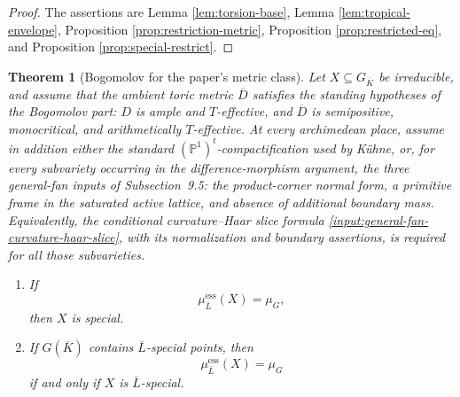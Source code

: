 \documentclass[10pt,a4paper]{amsart}
\theoremstyle{plain}
\newtheorem{theorem}{Theorem}
\theoremstyle{plain}
\numberwithin{equation}{section}
\providecommand{\bD}{\overline{D}}
\providecommand{\bL}{\overline{L}}
\providecommand{\muess}{\mu^{\mathrm{ess}}}
\begin{document}
\begin{proof}
	The assertions are Lemma \ref{lem:torsion-base}, Lemma
	\ref{lem:tropical-envelope}, Proposition \ref{prop:restriction-metric},
	Proposition \ref{prop:restricted-eq}, and Proposition
	\ref{prop:special-restrict}.
\end{proof}

\begin{theorem}[Bogomolov for the paper's metric class]\label{thm:bogomolov}
	Let \(X\subseteq G_{\overline{K}}\) be irreducible, and assume that the ambient
	toric metric \(\bD\) satisfies the standing hypotheses of the Bogomolov part:
	\(D\) is ample and \(T\)-effective, and \(\bD\) is semipositive, monocritical, and
	arithmetically \(T\)-effective.
	At every archimedean place, assume in addition either the standard
	\((\mathbb P^1)^t\)-compactification used by K\"uhne, or, for every subvariety
	occurring in the difference-morphism argument, the three general-fan inputs of
	Subsection~9.5: the product-corner normal form, a primitive frame in the
	saturated active lattice, and absence of additional boundary mass.  Equivalently,
	the conditional curvature--Haar slice formula
	\ref{input:general-fan-curvature-haar-slice}, with its normalization and
	boundary assertions, is required for all those subvarieties.
	\begin{enumerate}[label=(\arabic*),leftmargin=2em]
		\item If
		\[
		\muess_{\bL}(X)=\mu_G,
		\]
		then \(X\) is special.
		\item If \(G(\overline{K})\) contains \(\bL\)-special points, then
		\[
		\muess_{\bL}(X)=\mu_G
		\]
		if and only if \(X\) is \(\bL\)-special.
	\end{enumerate}
\end{theorem}
\end{document}

